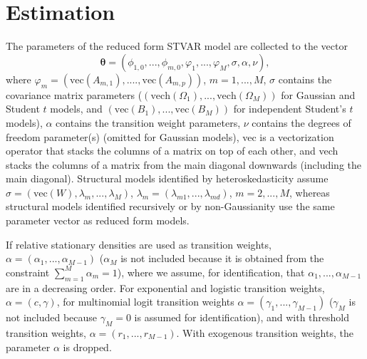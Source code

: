 \documentclass[nojss]{jss}
\begin{document}
\section{Estimation}\label{sec:estimation}
The parameters of the reduced form STVAR model are collected to the vector
\begin{equation}\label{eq:paramvector}
\boldsymbol{\theta}=(\phi_{1,0},...,\phi_{m,0},\varphi_1,...,\varphi_M,\sigma,\alpha,\nu),
\end{equation}
where $\varphi_m=(\text{vec}(A_{m,1}),....,\text{vec}(A_{m,p}))$, $m=1,...,M$, $\sigma$ contains the covariance matrix parameters ($(\text{vech}(\Omega_1),...,\text{vech}(\Omega_M))$ for Gaussian and Student $t$ models, and $(\text{vec}(B_1),...,\text{vec}(B_M))$ for independent Student's $t$ models), $\alpha$ contains the transition weight parameters, $\nu$ contains the degrees of freedom parameter(s) (omitted for Gaussian models), vec is a vectorization operator that stacks the columns of a matrix on top of each other, and vech stacks the columns of a matrix from the main diagonal downwards (including the main diagonal). Structural models identified by heteroskedasticity assume $\sigma = (\text{vec}(W),\lambda_m,...,\lambda_M)$, $\lambda_m=(\lambda_{m1},...,\lambda_{md})$, $m=2,...,M$, whereas structural models identified recursively or by non-Gaussianity use the same parameter vector as reduced form models.

If relative stationary densities are used as transition weights, $\alpha=(\alpha_1,...,\alpha_{M-1})$ ($\alpha_M$ is not included because it is obtained from the constraint $\sum_{m=1}^M \alpha_m=1$), where we assume, for identification, that $\alpha_1,...,\alpha_{M-1}$ are in a decreasing order. For exponential and logistic transition weights, $\alpha=(c,\gamma)$, for multinomial logit transition weights  $\alpha=(\gamma_1,...,\gamma_{M-1})$ ($\gamma_M$ is not included because $\gamma_M=0$ is assumed for identification), and with threshold transition weights, $\alpha=(r_1,...,r_{M-1})$. With exogenous transition weights, the parameter $\alpha$ is dropped.
\end{document}
